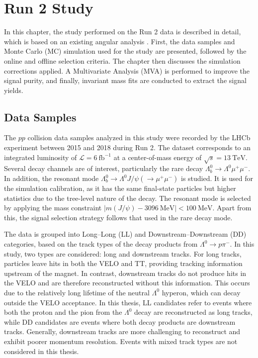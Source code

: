 \chapter{Run 2 Study}
\label{ch:run2}
In this chapter, the study performed on the Run 2 data is described in detail, which is based on an existing angular analysis \cite{Janina}. First, the data samples and Monte Carlo (MC) simulation used for the study are presented, followed by the online and offline selection criteria. The chapter then discusses the simulation corrections applied. A Multivariate Analysis (MVA) is performed to improve the signal purity, and finally, invariant mass fits are conducted to extract the signal yields.

\section{Data Samples}
\label{sec:run2_data_samples}
The $pp$ collision data samples analyzed in this study were recorded by the LHCb experiment between 2015 and 2018 during Run 2. The dataset corresponds to an integrated luminosity of $\mathcal{L} = \qty{6}{\femto\barn}^{-1}$ at a center-of-mass energy of $\sqrt{s} = \qty{13}{\tera\electronvolt}$. Several decay channels are of interest, particularly the rare decay $\Lambda_b^0 \to \Lambda^0 \mu^+ \mu^-$. In addition, the  resonant mode $\Lambda_b^0 \to \Lambda^0 J/\psi (\to \mu^+ \mu^-)$ is studied. It is used for the simulation calibration, as it has the same final-state particles but higher statistics due to the tree-level nature of the decay. The resonant mode is selected by applying the mass constraint $\vert m(J/\psi)-\qty{3096}{\mega\electronvolt} \vert < \qty{100}{\mega\electronvolt}$. Apart from this, the signal selection strategy follows that used in the rare decay mode.

The data is grouped into Long--Long (LL) and Downstream--Downstream (DD) categories, based on the track types of the decay products from $\Lambda^0 \to p \pi^-$. In this study, two types are considered: long and downstream tracks. For long tracks, particles leave hits in both the VELO and TT, providing tracking information upstream of the magnet. In contrast, downstream tracks do not produce hits in the VELO and are therefore reconstructed without this information. This occurs due to the relatively long lifetime of the neutral $\Lambda^0$ hyperon, which can decay outside the VELO acceptance. In this thesis, LL candidates refer to events where both the proton and the pion from the $\Lambda^0$ decay are reconstructed as long tracks, while DD candidates are events where both decay products are downstream tracks. Generally, downstream tracks are more challenging to reconstruct and exhibit poorer momentum resolution. Events with mixed track types are not considered in this thesis.

